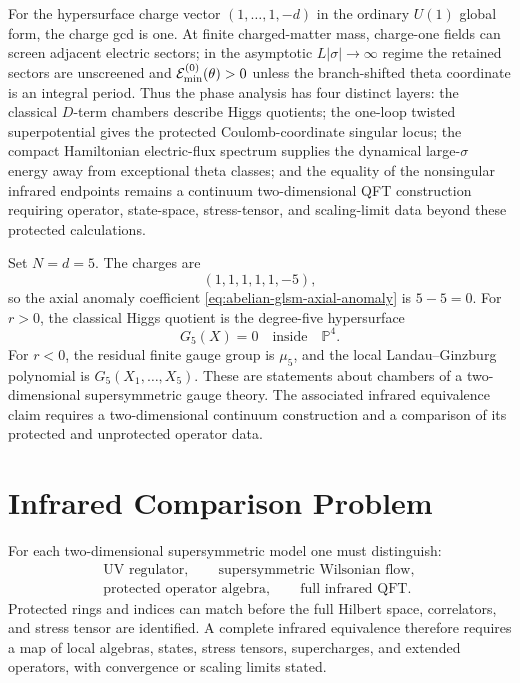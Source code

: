 For the hypersurface charge vector \((1,\ldots,1,-d)\) in the ordinary
\(U(1)\) global form, the charge gcd is one.  At finite charged-matter mass,
charge-one fields can screen adjacent electric sectors; in the asymptotic
\(L|\sigma|\to\infty\) regime the retained sectors are unscreened and
\(\mathcal E^{(0)}_{\rm min}(\theta)>0\) unless the branch-shifted theta
coordinate is an integral period.  Thus the phase analysis has four distinct
layers: the classical \(D\)-term chambers describe Higgs quotients; the
one-loop twisted superpotential gives the protected Coulomb-coordinate
singular locus; the compact Hamiltonian electric-flux spectrum supplies the
dynamical large-\(\sigma\) energy away from exceptional theta classes; and
the equality of the nonsingular infrared endpoints remains a continuum
two-dimensional QFT construction requiring operator, state-space, stress-tensor,
and scaling-limit data beyond these protected calculations.

\begin{example}
\label{ex:quintic-glsm-intrinsic-qft}
Set \(N=d=5\).  The charges are
\[
  (1,1,1,1,1,-5),
\]
so the axial anomaly coefficient
\eqref{eq:abelian-glsm-axial-anomaly} is \(5-5=0\).  For \(r>0\), the
classical Higgs quotient is the degree-five hypersurface
\[
  G_5(X)=0
  \quad\text{inside}\quad
  \mathbb P^4.
\]
For \(r<0\), the residual finite gauge group is \(\mu_5\), and the local
Landau--Ginzburg polynomial is \(G_5(X_1,\ldots,X_5)\).  These are
statements about chambers of a two-dimensional supersymmetric gauge theory.
The associated infrared equivalence claim requires a two-dimensional
continuum construction and a comparison of its protected and unprotected
operator data.
\end{example}

\section{Infrared Comparison Problem}

For each two-dimensional supersymmetric model one must distinguish:
\[
\begin{gathered}
  \text{UV regulator},\qquad
  \text{supersymmetric Wilsonian flow},\\
  \text{protected operator algebra},\qquad
  \text{full infrared QFT}.
\end{gathered}
\]
Protected rings and indices can match before the full Hilbert space,
correlators, and stress tensor are identified.  A complete infrared
equivalence therefore requires a map of local algebras, states, stress
tensors, supercharges, and extended operators, with convergence or scaling
limits stated.


